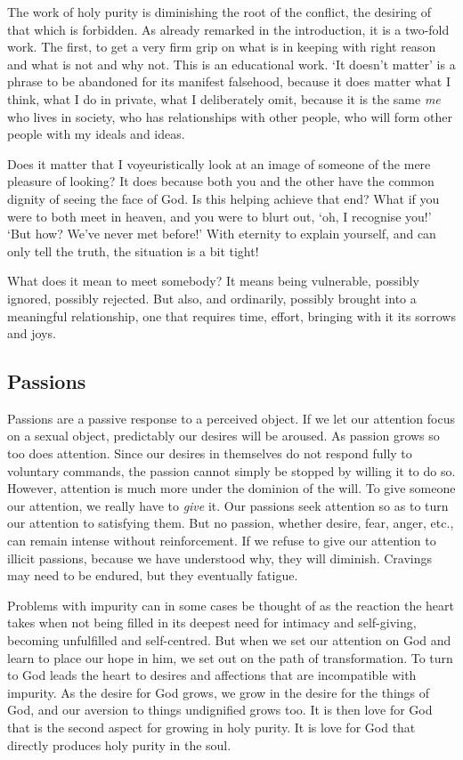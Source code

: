 \documentclass[12pt]{article}
\begin{document}
The work of holy purity is diminishing the root of the conflict, the desiring of that which is forbidden. As already remarked in the introduction, it is a two-fold work. The first, to get a very firm grip on what is in keeping with right reason and what is not and why not. This is an educational work. `It doesn't matter' is a phrase to be abandoned for its manifest falsehood, because it does matter what I think, what I do in private, what I deliberately omit, because it is the same \emph{me} who lives in society, who has relationships with other people, who will form other people with my ideals and ideas.

Does it matter that I voyeuristically look at an image of someone of the mere pleasure of looking? It does because both you and the other have the common dignity of seeing the face of God. Is this helping achieve that end? What if you were to both meet in heaven, and you were to blurt out, `oh, I recognise you!' `But how? We've never met before!' With eternity to explain yourself, and can only tell the truth, the situation is a bit tight!

What does it mean to meet somebody? It means being vulnerable, possibly ignored, possibly rejected. But also, and ordinarily, possibly brought into a meaningful relationship, one that requires time, effort, bringing with it its sorrows and joys.

\subsection*{Passions}

Passions are a passive response to a perceived object. If we let our attention focus on a sexual object, predictably our desires will be aroused. As passion grows so too does attention. Since our desires in themselves do not respond fully to voluntary commands, the passion cannot simply be stopped by willing it to do so. However, attention is much more under the dominion of the will. To give someone our attention, we really have to \emph{give} it. Our passions seek attention so as to turn our attention to satisfying them. But no passion, whether desire, fear, anger, etc., can remain intense without reinforcement. If we refuse to give our attention to illicit passions, because we have understood why, they will diminish. Cravings may need to be endured, but they eventually fatigue.

Problems with impurity can in some cases be thought of as the reaction the heart takes when not being filled in its deepest need for intimacy and self-giving, becoming unfulfilled and self-centred. But when we set our attention on God and learn to place our hope in him, we set out on the path of transformation. To turn to God leads the heart to desires and affections that are incompatible with impurity. As the desire for God grows, we grow in the desire for the things of God, and our aversion to things undignified grows too. It is then love for God that is the second aspect for growing in holy purity. It is love for God that directly produces holy purity in the soul.
\end{document}
